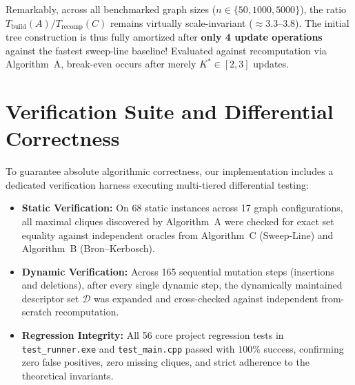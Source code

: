 Remarkably, across all benchmarked graph sizes ($n \in \{50, 1000, 5000\}$), the ratio $T_{\text{build}}(A) / T_{\text{recomp}}(C)$ remains virtually scale-invariant ($\approx 3.3\text{--}3.8$). The initial tree construction is thus fully amortized after \textbf{only 4 update operations} against the fastest sweep-line baseline! Evaluated against recomputation via Algorithm~A, break-even occurs after merely $K^* \in [2, 3]$ updates.

\section{Verification Suite and Differential Correctness}
\label{sec:exp_verification}

To guarantee absolute algorithmic correctness, our implementation includes a dedicated verification harness executing multi-tiered differential testing:
\begin{itemize}
    \item \textbf{Static Verification:} On 68 static instances across 17 graph configurations, all maximal cliques discovered by Algorithm~A were checked for exact set equality against independent oracles from Algorithm~C (Sweep-Line) and Algorithm~B (Bron--Kerbosch).
    \item \textbf{Dynamic Verification:} Across 165 sequential mutation steps (insertions and deletions), after every single dynamic step, the dynamically maintained descriptor set $\mathcal{D}$ was expanded and cross-checked against independent from-scratch recomputation.
    \item \textbf{Regression Integrity:} All 56 core project regression tests in \texttt{test\_runner.exe} and \texttt{test\_main.cpp} passed with $100\%$ success, confirming zero false positives, zero missing cliques, and strict adherence to the theoretical invariants.
\end{itemize}
